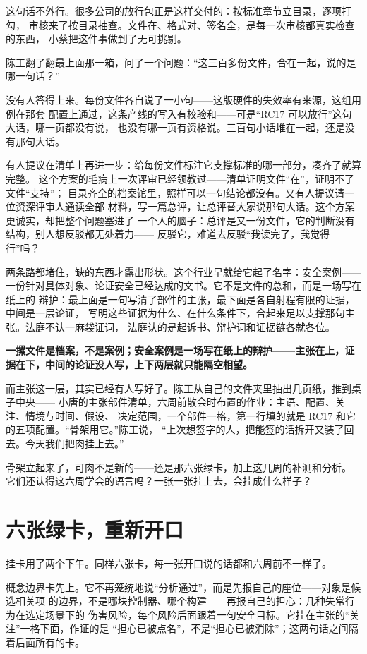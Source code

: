这句话不外行。很多公司的放行包正是这样交付的：按标准章节立目录，逐项打勾，
审核来了按目录抽查。文件在、格式对、签名全，是每一次审核都真实检查的东西，
小蔡把这件事做到了无可挑剔。

陈工翻了翻最上面那一箱，问了一个问题：“这三百多份文件，合在一起，说的是哪一句话？”

没有人答得上来。每份文件各自说了一小句——这版硬件的失效率有来源，这组用例在那套
配置上通过，这条产线的写入有校验和——可是“RC17 可以放行”这句大话，哪一页都没有说，
也没有哪一页有资格说。三百句小话堆在一起，还是没有那句大话。

有人提议在清单上再进一步：给每份文件标注它支撑标准的哪一部分，凑齐了就算完整。
这个方案的毛病上一次评审已经领教过——清单证明文件“在”，证明不了文件“支持”；
目录齐全的档案馆里，照样可以一句结论都没有。又有人提议请一位资深评审人通读全部
材料，写一篇总评，让总评替大家说那句大话。这个方案更诚实，却把整个问题塞进了
一个人的脑子：总评是又一份文件，它的判断没有结构，别人想反驳都无处着力——
反驳它，难道去反驳“我读完了，我觉得行”吗？

两条路都堵住，缺的东西才露出形状。这个行业早就给它起了名字：安全案例——
一份针对具体对象、论证安全已经达成的文书。它不是文件的总和，而是一场写在纸上的
辩护：最上面是一句写清了部件的主张，最下面是各自射程有限的证据，中间是一层论证，
写明这些证据为什么、在什么条件下，合起来足以支撑那句主张。法庭不认一麻袋证词，
法庭认的是起诉书、辩护词和证据链各就各位。

\textbf{一摞文件是档案，不是案例；安全案例是一场写在纸上的辩护——主张在上，证据在下，中间的论证没人写，上下两层就只能隔空相望。}

而主张这一层，其实已经有人写好了。陈工从自己的文件夹里抽出几页纸，推到桌子中央——
小唐的主张部件清单，六周前散会时布置的作业：主语、配置、关注、情境与时间、假设、
决定范围，一个部件一格，第一行填的就是 RC17 和它的五项配置。“骨架用它。”陈工说，
“上次想签字的人，把能签的话拆开又装了回去。今天我们把肉挂上去。”

骨架立起来了，可肉不是新的——还是那六张绿卡，加上这几周的补测和分析。
它们还认得这六周学会的语言吗？一张一张挂上去，会挂成什么样子？

\section{六张绿卡，重新开口}

挂卡用了两个下午。同样六张卡，每一张开口说的话都和六周前不一样了。

概念边界卡先上。它不再笼统地说“分析通过”，而是先报自己的座位——对象是候选相关项
的边界，不是哪块控制器、哪个构建——再报自己的担心：几种失常行为在选定场景下的
伤害风险，每个风险后面跟着一句安全目标。它挂在主张的“关注”一格下面，作证的是
“担心已被点名”，不是“担心已被消除”；这两句话之间隔着后面所有的卡。

